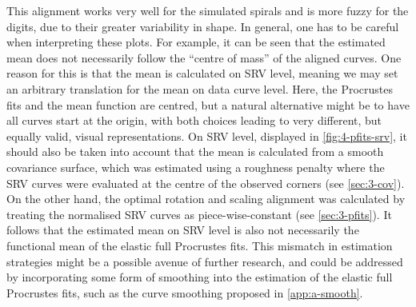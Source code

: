 This alignment works very well for the simulated spirals and is more fuzzy for the digits, due to their greater variability in shape. 
In general, one has to be careful when interpreting these plots.
For example, it can be seen that the estimated mean does not necessarily follow the \enquote{centre of mass} of the aligned curves. 
One reason for this is that the mean is calculated on SRV level, meaning we may set an arbitrary translation for the mean on data curve level.
Here, the Procrustes fits and the mean function are centred, but a natural alternative might be to have all curves start at the origin, with both choices leading to very different, but equally valid, visual representations.
On SRV level, displayed in \cref{fig:4-pfits-srv}, it should also be taken into account that the mean is calculated from a smooth covariance surface, which was estimated using a roughness penalty where the SRV curves were evaluated at the centre of the observed corners (see \cref{sec:3-cov}).
On the other hand, the optimal rotation and scaling alignment was calculated by treating the normalised SRV curves as piece-wise-constant (see \cref{sec:3-pfits}).
It follows that the estimated mean on SRV level is also not necessarily the functional mean of the elastic full Procrustes fits.
This mismatch in estimation strategies might be a possible avenue of further research, and could be addressed by incorporating some form of smoothing into the estimation of the elastic full Procrustes fits, such as the curve smoothing proposed in \cref{app:a-smooth}.

